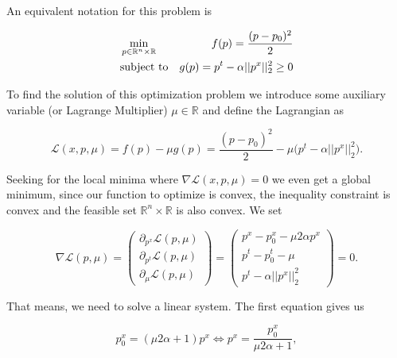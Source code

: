             An equivalent notation for this problem is

            \begin{eqnarray}
                &\min\limits_{p \in \mathbb{R}^{n} \times \mathbb{R}}& f(p) = \frac{(p - p_{0})^{2}}{2} \notag \\
                &\textnormal{subject to}& g(p) = p^{t} - \alpha ||p^{x}||_{2}^{2} \ge 0 \notag
            \end{eqnarray}

        To find the solution of this optimization problem we introduce some auxiliary variable (or Lagrange Multiplier) $\mu \in \mathbb{R}$ and define the Lagrangian as

        \begin{equation}
            \mathcal{L}(x, p, \mu) = f(p) - \mu g(p) = \frac{(p - p_{0})^{2}}{2} - \mu \bigg( p^{t} - \alpha||p^{x}||_{2}^{2} \bigg).
        \end{equation}

        Seeking for the local minima where $\nabla \mathcal{L}(x, p, \mu) = 0$ we even get a global minimum, since our function to optimize is convex, the inequality constraint is convex and the feasible set $\mathbb{R}^{n} \times \mathbb{R}$ is also convex. We set

        \begin{equation}
            \nabla \mathcal{L}(p, \mu) =
            \begin{pmatrix}
                \partial_{p^{x}} \mathcal{L}(p, \mu) \\
                \partial_{p^{t}} \mathcal{L}(p, \mu) \\
                \partial_{\mu} \mathcal{L}(p, \mu)
            \end{pmatrix} = 
            \begin{pmatrix}
                p^{x} - p_{0}^{x} - \mu 2 \alpha p^{x} \\
                p^{t} - p_{0}^{t} - \mu \\
                p^{t} - \alpha||p^{x}||_{2}^{2}
            \end{pmatrix}
            = 0. \label{eq:linearSystem}
        \end{equation}

        That means, we need to solve a linear system. The first equation gives us

        \begin{equation}
            p_{0}^{x} = (\mu 2 \alpha + 1) p^{x} \Longleftrightarrow p^{x} = \frac{p_{0}^{x}}{\mu 2 \alpha + 1}, \label{eq:1stequ}
        \end{equation}

